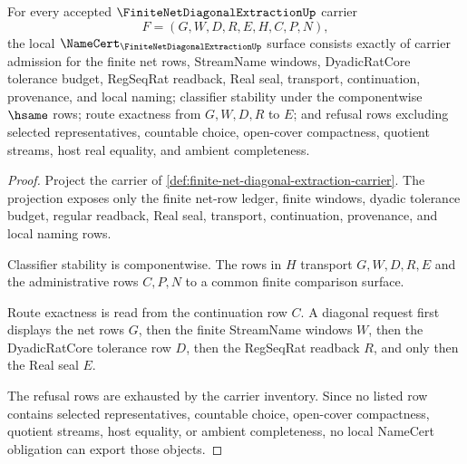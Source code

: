 \begin{theorem}
\label{thm:finite-net-diagonal-extraction-namecert-obligations}
For every accepted $\FiniteNetDiagonalExtractionUp$ carrier
$$
F=(G,W,D,R,E,H,C,P,N),
$$
the local $\NameCert_{\FiniteNetDiagonalExtractionUp}$ surface consists
exactly of carrier admission for the finite net rows, StreamName windows,
DyadicRatCore tolerance budget, RegSeqRat readback, Real seal, transport,
continuation, provenance, and local naming; classifier stability under the
componentwise $\hsame$ rows; route exactness from $G,W,D,R$ to $E$; and
refusal rows excluding selected representatives, countable choice, open-cover
compactness, quotient streams, host real equality, and ambient completeness.
\end{theorem}
\begin{proof}
Project the carrier of
\autoref{def:finite-net-diagonal-extraction-carrier}. The projection exposes
only the finite net-row ledger, finite windows, dyadic tolerance budget,
regular readback, Real seal, transport, continuation, provenance, and local
naming rows.

Classifier stability is componentwise. The rows in $H$ transport $G,W,D,R,E$
and the administrative rows $C,P,N$ to a common finite comparison surface.

Route exactness is read from the continuation row $C$. A diagonal request first
displays the net rows $G$, then the finite StreamName windows $W$, then the
DyadicRatCore tolerance row $D$, then the RegSeqRat readback $R$, and only then
the Real seal $E$.

The refusal rows are exhausted by the carrier inventory. Since no listed row
contains selected representatives, countable choice, open-cover compactness,
quotient streams, host equality, or ambient completeness, no local NameCert
obligation can export those objects.
\end{proof}

